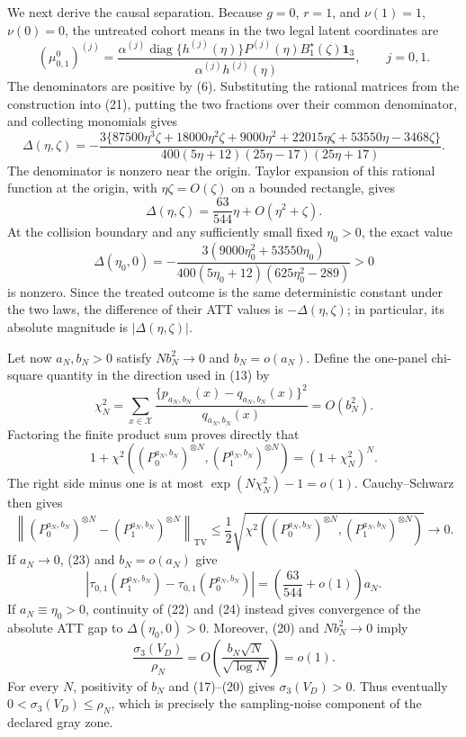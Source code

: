 We next derive the causal separation. Because \(g=0\), \(r=1\), and \(\nu(1)=1\), \(\nu(0)=0\), the untreated cohort means in the two legal latent coordinates are
\[
 (\mu^0_{0,1})^{(j)}
 =\frac{\alpha^{(j)}\operatorname{diag}\{h^{(j)}(\eta)\}
 P^{(j)}(\eta)B_1^{\star}(\zeta)\mathbf 1_3}
 {\alpha^{(j)}h^{(j)}(\eta)},
 \qquad j=0,1.                                                \tag{21}
\]
The denominators are positive by (6). Substituting the rational matrices from the construction into (21), putting the two fractions over their common denominator, and collecting monomials gives
\[
 \Delta(\eta,\zeta)
 =-\frac{3\{87500\eta^3\zeta+18000\eta^2\zeta+9000\eta^2+22015\eta\zeta+53550\eta-3468\zeta\}}
 {400(5\eta+12)(25\eta-17)(25\eta+17)}.                    \tag{22}
\]
The denominator is nonzero near the origin. Taylor expansion of this rational function at the origin, with \(\eta\zeta=O(\zeta)\) on a bounded rectangle, gives
\[
 \Delta(\eta,\zeta)=\frac{63}{544}\eta+O(\eta^2+\zeta).   \tag{23}
\]
At the collision boundary and any sufficiently small fixed \(\eta_0>0\), the exact value
\[
 \Delta(\eta_0,0)
 =-\frac{3(9000\eta_0^2+53550\eta_0)}
 {400(5\eta_0+12)(625\eta_0^2-289)}>0                       \tag{24}
\]
is nonzero. Since the treated outcome is the same deterministic constant under the two laws, the difference of their ATT values is \(-\Delta(\eta,\zeta)\); in particular, its absolute magnitude is \(|\Delta(\eta,\zeta)|\).

Let now \(a_N,b_N>0\) satisfy \(Nb_N^2\to0\) and \(b_N=o(a_N)\). Define the one-panel chi-square quantity in the direction used in (13) by
\[
 \chi_N^2=\sum_{x\in\mathcal X}
 \frac{\{p_{a_N,b_N}(x)-q_{a_N,b_N}(x)\}^2}
 {q_{a_N,b_N}(x)}=O(b_N^2).                                  \tag{25}
\]
Factoring the finite product sum proves directly that
\[
 1+\chi^2\!\left((P_0^{a_N,b_N})^{\otimes N},
                  (P_1^{a_N,b_N})^{\otimes N}\right)
 =(1+\chi_N^2)^N.                                             \tag{26}
\]
The right side minus one is at most \(\exp(N\chi_N^2)-1=o(1)\). Cauchy--Schwarz then gives
\[
 \left\|(P_0^{a_N,b_N})^{\otimes N}
       -(P_1^{a_N,b_N})^{\otimes N}\right\|_{\mathrm{TV}}
 \le\frac12\sqrt{\chi^2\!\left((P_0^{a_N,b_N})^{\otimes N},
                  (P_1^{a_N,b_N})^{\otimes N}\right)}
 \longrightarrow0.                                           \tag{27}
\]
If \(a_N\to0\), (23) and \(b_N=o(a_N)\) give
\[
 |\tau_{0,1}(P_1^{a_N,b_N})-
   \tau_{0,1}(P_0^{a_N,b_N})|
 =\left(\frac{63}{544}+o(1)\right)a_N.                      \tag{28}
\]
If \(a_N\equiv\eta_0>0\), continuity of (22) and (24) instead gives convergence of the absolute ATT gap to \(\Delta(\eta_0,0)>0\). Moreover, (20) and \(Nb_N^2\to0\) imply
\[
 \frac{\sigma_3(V_D)}{\rho_N}
 =O\!\left(\frac{b_N\sqrt N}{\sqrt{\log N}}\right)
 =o(1).                                                       \tag{29}
\]
For every \(N\), positivity of \(b_N\) and (17)--(20) gives \(\sigma_3(V_D)>0\). Thus eventually \(0<\sigma_3(V_D)\le\rho_N\), which is precisely the sampling-noise component of the declared gray zone.

